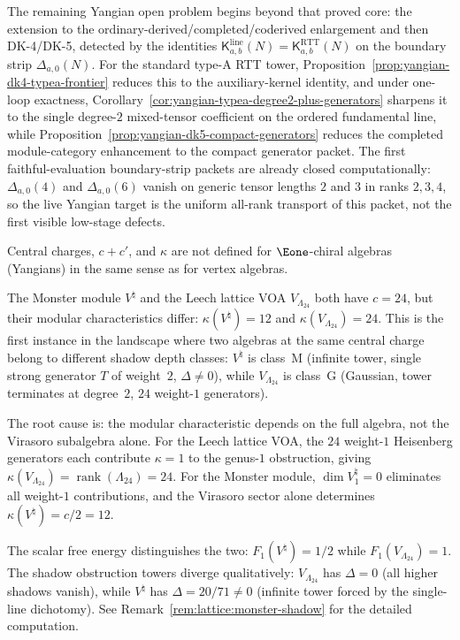 The remaining Yangian open problem begins beyond that proved core: the
extension to the ordinary-derived/completed/coderived enlargement and
then DK-4/DK-5, detected by the identities
$\mathsf{K}^{\mathrm{line}}_{a,b}(N)
=\mathsf{K}^{\mathrm{RTT}}_{a,b}(N)$
on the boundary strip $\Delta_{a,0}(N)$. For the standard type-A RTT
tower, Proposition~\ref{prop:yangian-dk4-typea-frontier} reduces this
to the auxiliary-kernel identity, and under one-loop exactness,
Corollary~\ref{cor:yangian-typea-degree2-plus-generators} sharpens it
to the single degree-$2$ mixed-tensor coefficient on the ordered
fundamental line, while
Proposition~\ref{prop:yangian-dk5-compact-generators} reduces the
completed module-category enhancement to the compact generator packet.
The first faithful-evaluation boundary-strip packets are already
closed computationally: $\Delta_{a,0}(4)$ and $\Delta_{a,0}(6)$
vanish on generic tensor lengths $2$ and $3$ in ranks $2,3,4$, so the
live Yangian target is the uniform all-rank transport of this
packet, not the first visible low-stage defects.

Central charges, $c{+}c'$, and $\kappa$ are not defined for
$\Eone$-chiral algebras (Yangians) in the same sense as for
vertex algebras.

\begin{remark}%
\label{rem:census-moonshine-leech-discrimination}%
%
%
%
The Monster module $V^\natural$ and the Leech lattice VOA
$V_{\Lambda_{24}}$ both have $c = 24$, but their modular
characteristics differ: $\kappa(V^\natural) = 12$ and
$\kappa(V_{\Lambda_{24}}) = 24$. This is the first instance in
the landscape where two algebras at the same central charge
belong to different shadow depth classes: $V^\natural$ is class~M
(infinite tower, single strong generator $T$ of weight~$2$,
$\Delta \neq 0$), while $V_{\Lambda_{24}}$ is class~G (Gaussian,
tower terminates at degree~$2$, $24$ weight-$1$ generators).

The root cause is: the modular characteristic depends on
the full algebra, not the Virasoro subalgebra alone. For the
Leech lattice VOA, the $24$ weight-$1$ Heisenberg generators
each contribute $\kappa = 1$ to the genus-$1$ obstruction,
giving $\kappa(V_{\Lambda_{24}}) = \operatorname{rank}(\Lambda_{24}) = 24$.
For the Monster module, $\dim V_1^\natural = 0$ eliminates all
weight-$1$ contributions, and the Virasoro sector alone determines
$\kappa(V^\natural) = c/2 = 12$.

The scalar free energy distinguishes the two: $F_1(V^\natural) = 1/2$
while $F_1(V_{\Lambda_{24}}) = 1$. The shadow obstruction towers
diverge qualitatively: $V_{\Lambda_{24}}$ has $\Delta = 0$ (all
higher shadows vanish), while $V^\natural$ has $\Delta = 20/71 \neq 0$
(infinite tower forced by the single-line dichotomy).
See Remark~\ref{rem:lattice:monster-shadow} for the detailed
computation.
\end{remark}

